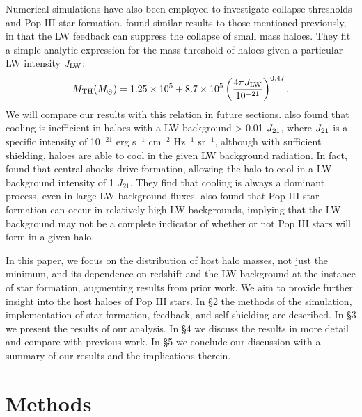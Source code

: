 \documentclass[fleqn,usenatbib]{mnras}
\begin{document}
Numerical simulations have also been employed to investigate collapse thresholds and Pop III star formation. \citet[hereafter M01]{Machacek01} found similar results to those mentioned previously, in that the LW feedback can suppress the collapse of small mass haloes. They fit a simple analytic expression for the mass threshold of haloes given a particular LW intensity $J_{\rm LW}$:
\begin{equation} \label{mthresh}
	M_{\rm TH} ( M_{\odot} ) = 1.25 \times 10^{5} + 8.7  \times 10^{5} \left( \frac{4 \pi J_{\rm LW}}{10^{-21}} \right)^{0.47} .
\end{equation}
We will compare our results with this relation in future sections. \citet{Yoshida03} also found that cooling is inefficient in haloes with a LW background > 0.01 $J_{\rm 21}$, where $J_{\rm 21}$ is a specific intensity of 10$^{-21}$ erg s$^{-1}$ cm$^{-2}$ Hz$^{-1}$ sr$^{-1}$, although with sufficient \hh{} shielding, haloes are able to cool in the given LW background radiation. In fact, \citet{Wise07_UVB} found that central shocks drive \hh{} formation, allowing the halo to cool in a LW background intensity of 1 $J_{21}$. They find that \hh{} cooling is always a dominant process, even in large LW background fluxes. \citet{OShea08} also found that Pop III star formation can occur in relatively high LW backgrounds, implying that the LW background may not be a complete indicator of whether or not Pop III stars will form in a given halo.    

In this paper, we focus on the distribution of host halo masses, not just the minimum, and its dependence on redshift and the LW background at the instance of star formation, augmenting results from prior work. We aim to provide further insight into the host haloes of Pop III stars. In \S 2 the methods of the simulation, implementation of star formation, feedback, and \hh{} self-shielding are described. In \S 3 we present the results of our analysis. In \S 4 we discuss the results in more detail and compare with previous work. In \S 5 we conclude our discussion with a summary of our results and the implications therein.

\section{Methods}
\end{document}
